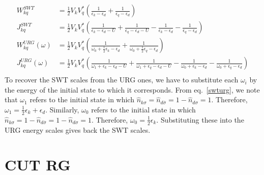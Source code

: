\documentclass[twoside]{report}
\numberwithin{equation}{section}
\begin{document}
\begin{equation}\begin{aligned}
	W^{SWT}_{kq} &= \frac{1}{2} V_k V_q^*\left(\frac{1}{\epsilon_k - \epsilon_d} + \frac{1}{\epsilon_q - \epsilon_d}\right)\\
	J^{SWT}_{kq} &= \frac{1}{2} V_k V_q^*\left(\frac{1}{\epsilon_k - \epsilon_d - U} + \frac{1}{\epsilon_q - \epsilon_d - U} - \frac{1}{\epsilon_k - \epsilon_d} - \frac{1}{\epsilon_q - \epsilon_d}\right)\\
	W^{URG}_{kq}(\omega) &= \frac{1}{2} V_k V_q^*\left(\frac{1}{\omega_0 + \frac{1}{2} \epsilon_k - \epsilon_d} + \frac{1}{\omega_0 + \frac{1}{2} \epsilon_q - \epsilon_d}\right)\\
	J^{URG}_{kq}(\omega) &= \frac{1}{2} V_k V_q^*\left(\frac{1}{\omega_1 + \epsilon_k - \epsilon_d - U} + \frac{1}{\omega_1 +\epsilon_q - \epsilon_d - U} - \frac{1}{\omega_0 +\epsilon_k - \epsilon_d} - \frac{1}{\omega_0 +\epsilon_q - \epsilon_d}\right)\\
\end{aligned}\end{equation}
To recover the SWT scales from the URG ones, we have to substitute each \(\omega_i\) by the energy of the initial state to which it corresponds. From eq.~\ref{swturg}, we note that \(\omega_1\) refers to the initial state in which \(\hat n_{k\sigma}=\hat n_{d\overline\sigma} = 1 - \hat n_{d\sigma} = 1\). Therefore, \(\omega_1 = \frac{1}{2}\epsilon_k + \epsilon_d\). Similarly, \(\omega_0\) refers to the initial state in which \(\hat n_{k\sigma}=1 - \hat n_{d\overline\sigma} = 1 - \hat n_{d\sigma} = 1\). Therefore, \(\omega_0 = \frac{1}{2}\epsilon_k\). Substituting these into the URG energy scales gives back the SWT scales.
\section{CUT RG}
\end{document}
